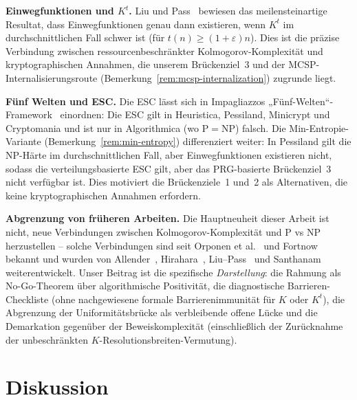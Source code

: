 \documentclass[aps,prd,twocolumn,superscriptaddress,nofootinbib]{revtex4-2}
\theoremstyle{definition}
\theoremstyle{remark}
\newcommand{\NP}{\mathrm{NP}}
\newcommand{\PP}{\mathrm{P}}
\begin{document}
\textbf{Einwegfunktionen und $K^t$.}
Liu und Pass~\cite{LiuPass2020} bewiesen das meilensteinartige Resultat, dass Einwegfunktionen genau dann existieren, wenn $K^t$ im durchschnittlichen Fall schwer ist (für $t(n) \geq (1+\varepsilon)n$). Dies ist die präzise Verbindung zwischen ressourcenbeschränkter Kolmogorov-Komplexität und kryptographischen Annahmen, die unserem Brückenziel~3 und der MCSP-Internalisierungsroute (Bemerkung~\ref{rem:mcsp-internalization}) zugrunde liegt.

\textbf{Fünf Welten und ESC.}
Die ESC lässt sich in Impagliazzos „Fünf-Welten“-Framework~\cite{Impagliazzo1995} einordnen: Die ESC gilt in Heuristica, Pessiland, Minicrypt und Cryptomania und ist nur in Algorithmica (wo $\PP = \NP$) falsch. Die Min-Entropie-Variante (Bemerkung~\ref{rem:min-entropy}) differenziert weiter: In Pessiland gilt die NP-Härte im durchschnittlichen Fall, aber Einwegfunktionen existieren nicht, sodass die verteilungsbasierte ESC gilt, aber das PRG-basierte Brückenziel~3 nicht verfügbar ist. Dies motiviert die Brückenziele~1 und~2 als Alternativen, die keine kryptographischen Annahmen erfordern.

\textbf{Abgrenzung von früheren Arbeiten.}
Die Hauptneuheit dieser Arbeit ist nicht, neue Verbindungen zwischen Kolmogorov-Komplexität und P vs NP herzustellen -- solche Verbindungen sind seit Orponen et al.~\cite{OrponenKoSchoeningWatanabe1994} und Fortnow~\cite{Fortnow2000} bekannt und wurden von Allender~\cite{Allender2001,Allender2006}, Hirahara~\cite{Hirahara2018}, Liu--Pass~\cite{LiuPass2020} und Santhanam~\cite{Santhanam2023} weiterentwickelt. Unser Beitrag ist die spezifische \emph{Darstellung}: die Rahmung als No-Go-Theorem über algorithmische Positivität, die diagnostische Barrieren-Checkliste (ohne nachgewiesene formale Barrierenimmunität für $K$ oder $K^t$), die Abgrenzung der Uniformitätsbrücke als verbleibende offene Lücke und die Demarkation gegenüber der Beweiskomplexität (einschließlich der Zurücknahme der unbeschränkten $K$-Resolutionsbreiten-Vermutung).

\section{Diskussion}
\label{sec:discussion}
\end{document}
